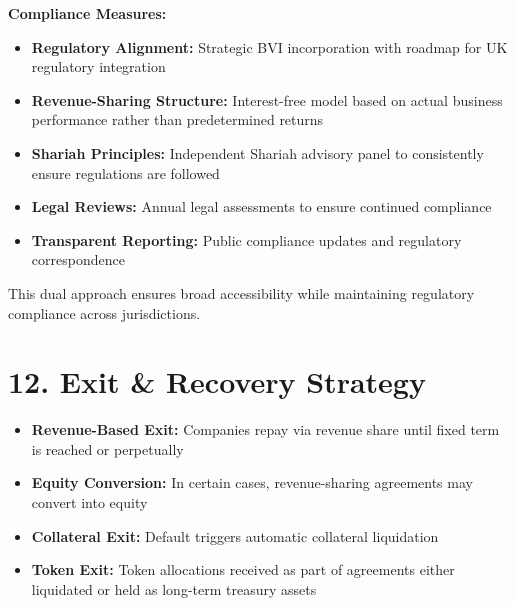 \documentclass[
  paper=a4,
  ,captions=tableheading
]{scrartcl}
\providecommand{\tightlist}{%
  \setlength{\itemsep}{0pt}\setlength{\parskip}{0pt}}
\begin{document}
\textbf{Compliance Measures:}

\begin{itemize}
\tightlist
\item
  \textbf{Regulatory Alignment:} Strategic BVI incorporation with
  roadmap for UK regulatory integration
\item
  \textbf{Revenue-Sharing Structure:} Interest-free model based on
  actual business performance rather than predetermined returns
\item
  \textbf{Shariah Principles:} Independent Shariah advisory panel to
  consistently ensure regulations are followed
\item
  \textbf{Legal Reviews:} Annual legal assessments to ensure continued
  compliance
\item
  \textbf{Transparent Reporting:} Public compliance updates and
  regulatory correspondence
\end{itemize}

This dual approach ensures broad accessibility while maintaining
regulatory compliance across jurisdictions.

\section{12. Exit \& Recovery Strategy}\label{exit-recovery-strategy}

\begin{itemize}
\tightlist
\item
  \textbf{Revenue-Based Exit:} Companies repay via revenue share until
  fixed term is reached or perpetually
\item
  \textbf{Equity Conversion:} In certain cases, revenue-sharing
  agreements may convert into equity
\item
  \textbf{Collateral Exit:} Default triggers automatic collateral
  liquidation
\item
  \textbf{Token Exit:} Token allocations received as part of agreements
  either liquidated or held as long-term treasury assets
\end{itemize}
\end{document}
